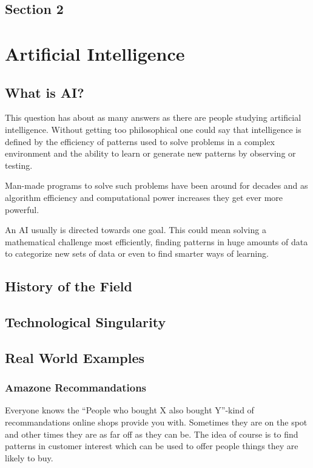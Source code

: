 
\section{Section 2}


\chapter{Artificial Intelligence}
\section{What is AI?}

This question has about as many answers as there are people studying artificial intelligence. Without getting too philosophical one could say that intelligence is defined by the efficiency of patterns used to solve problems in a complex environment and the ability to learn or generate new patterns by observing or testing.

Man-made programs to solve such problems have been around for decades and as algorithm efficiency and computational power increases they get ever more powerful.

An AI usually is directed towards one goal. This could mean solving a mathematical challenge most efficiently, finding patterns in huge amounts of data to categorize new sets of data or even to find smarter ways of learning.


\section{History of the Field}

\section{Technological Singularity}

\newpage
\section{Real World Examples}

\subsection{Amazone Recommandations}
Everyone knows the ``People who bought X also bought Y''-kind of recommandations online shops provide you with. Sometimes they are on the spot and other times they are as far off as they can be. The idea of course is to find patterns in customer interest which can be used to offer people things they are likely to buy.

